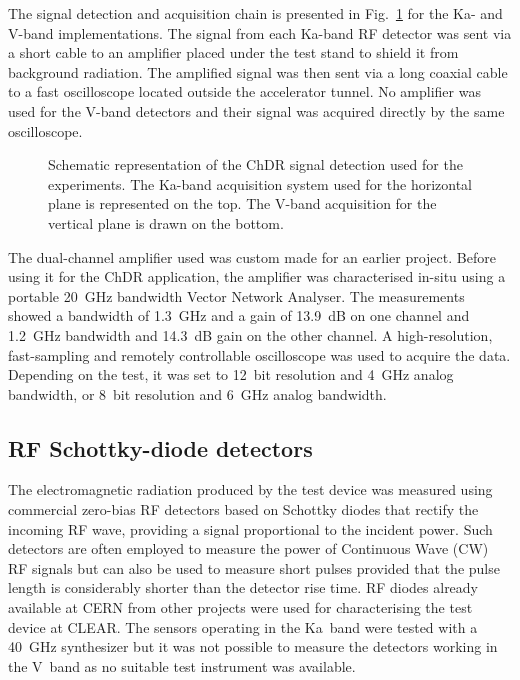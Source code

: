 The signal detection and acquisition chain is presented in Fig.~\ref{fig:scheme_acquisition} for the Ka- and V-band implementations. The signal from each Ka-band RF detector was sent via a short cable to an amplifier placed under the test stand to shield it from background radiation. The amplified signal was then sent via a long coaxial cable to a fast oscilloscope located outside the accelerator tunnel. No amplifier was used for the V-band detectors and their signal was acquired directly by the same oscilloscope. 

\begin{figure}[t]
\centering


\caption{Schematic representation of the ChDR signal detection used for the experiments. The Ka-band acquisition system used for the horizontal plane is represented on the top. The V-band acquisition for the vertical plane is drawn on the bottom.}
\label{fig:scheme_acquisition}
\end{figure}

The dual-channel amplifier used was custom made for an earlier project. Before using it for the ChDR application, the amplifier was characterised in-situ using a portable 20~GHz bandwidth Vector Network Analyser. The measurements showed a bandwidth of 1.3~GHz and a gain of 13.9~dB on one channel and 1.2~GHz bandwidth and 14.3~dB gain on the other channel. A high-resolution, fast-sampling and remotely controllable oscilloscope was used to acquire the data. Depending on the test, it was set to 12~bit resolution and 4~GHz analog bandwidth, or 8~bit resolution and 6~GHz analog bandwidth.

\subsection[RF Schottky-diode detectors]{RF Schottky-diode detectors}\label{sec:diodes}

The electromagnetic radiation produced by the test device was measured using commercial zero-bias RF detectors based on Schottky diodes that rectify the incoming RF wave, providing a signal proportional to the incident power. Such detectors are often employed to measure the power of Continuous Wave (CW) RF signals but can also be used to measure short pulses provided that the pulse length is considerably shorter than the detector rise time. RF diodes already available at CERN from other projects were used for characterising the test device at CLEAR. The sensors operating in the Ka~band were tested with a 40~GHz synthesizer but it was not possible to measure the detectors working in the V~band as no suitable test instrument was available.

